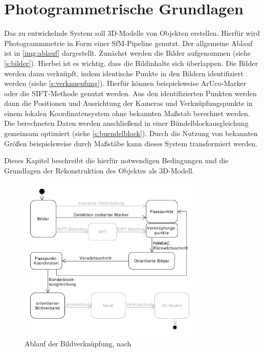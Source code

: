 \documentclass[./00PhotoBox.tex]{subfiles}
\begin{document}
\chapter{Photogrammetrische Grundlagen}
\label{c:photogrammetrie}
Das zu entwickelnde System soll 3D-Modelle von Objekten erstellen. Hierfür wird Photogrammmetrie in Form einer \gls{SfM}-Pipeline genutzt.
Der allgemeine Ablauf ist in \autoref{img:ablauf} dargestellt. Zunächst werden die Bilder aufgenommen (siehe \autoref{s:bilder}). Hierbei ist es wichtig, dass die Bildinhalte sich überlappen.
Die Bilder werden dann verknüpft, indem identische Punkte in den Bildern identifiziert werden  (siehe \autoref{s:verknuepfung}). Hierfür können beispielsweise ArUco-Marker oder die SIFT-Methode genutzt werden.
Aus den identifizierten Punkten werden dann die Positionen und Ausrichtung der Kameras und Verknüpfungspunkte in einem lokalen Koordinatensystem ohne bekannten Maßstab berechnet werden. Die berechneten Daten werden anschließend in einer Bündelblockausgleichung gemeinsam optimiert (siehe \autoref{s:buendelblock}). Durch die Nutzung von bekannten Größen beispielsweise durch Maßstäbe kann dieses System transformiert werden.

Dieses Kapitel beschreibt die hierfür notwendigen Bedingungen und die Grundlagen der Rekonstruktion des Objektes als 3D-Modell.

\begin{figure}
    \centering
    \includegraphics[width=0.8\textwidth]{./img/uml/uml_ablauf.pdf}
    \caption{Ablauf der Bildverknüpfung, nach \citealt[S. 492]{luhmann}} %
    \label{img:ablauf} %
\end{figure}
\end{document}
